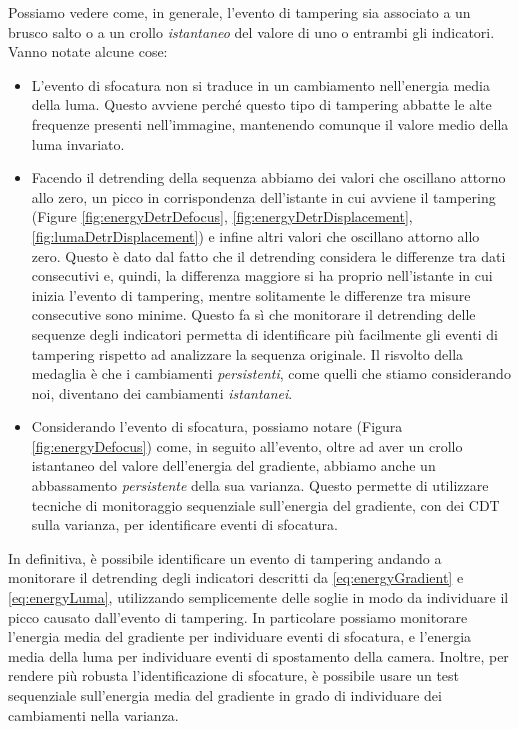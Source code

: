 \noindent Possiamo vedere come, in generale, l'evento di tampering sia associato a un brusco salto o a un crollo \textit{istantaneo} del valore di uno o entrambi gli indicatori.
Vanno notate alcune cose:
\begin{itemize}
	\item L'evento di sfocatura non si traduce in un cambiamento nell'energia media della luma.
	Questo avviene perch\'e questo tipo di tampering abbatte le alte frequenze presenti nell'immagine, mantenendo comunque il valore medio della luma invariato.
	\item Facendo il detrending della sequenza abbiamo dei valori che oscillano attorno allo zero, un picco in corrispondenza dell'istante in cui avviene il tampering (Figure \ref{fig:energyDetrDefocus}, \ref{fig:energyDetrDisplacement}, \ref{fig:lumaDetrDisplacement}) e infine altri valori che oscillano attorno allo zero.
	Questo \`e dato dal fatto che il detrending considera le differenze tra dati consecutivi e, quindi, la differenza maggiore si ha proprio nell'istante in cui inizia l'evento di tampering, mentre solitamente le differenze tra misure consecutive sono minime. 
	Questo fa s\`i che monitorare il detrending delle sequenze degli indicatori permetta di identificare pi\`u facilmente gli eventi di tampering rispetto ad analizzare la sequenza originale.
	Il risvolto della medaglia \`e che i cambiamenti \textit{persistenti}, come quelli che stiamo considerando noi, diventano dei cambiamenti \textit{istantanei}.
	\item Considerando l'evento di sfocatura, possiamo notare (Figura \ref{fig:energyDefocus}) come, in seguito all'evento, oltre ad aver un crollo istantaneo del valore dell'energia del gradiente, abbiamo anche un abbassamento \textit{persistente} della sua varianza.
	Questo permette di utilizzare tecniche di monitoraggio sequenziale sull'energia del gradiente, con dei CDT sulla varianza, per identificare eventi di sfocatura.
\end{itemize}
In definitiva, \`e possibile identificare un evento di tampering andando a monitorare il detrending degli indicatori descritti da \eqref{eq:energyGradient} e \eqref{eq:energyLuma}, utilizzando semplicemente delle soglie in modo da individuare il picco causato dall'evento di tampering.
In particolare possiamo monitorare l'energia media del gradiente per individuare eventi di sfocatura, e l'energia media della luma per individuare eventi di spostamento della camera.
Inoltre, per rendere pi\`u robusta l'identificazione di sfocature, \`e possibile usare un test sequenziale sull'energia media del gradiente in grado di individuare dei cambiamenti nella varianza.
